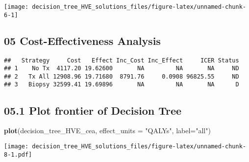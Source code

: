 \documentclass[
]{article}
\newenvironment{Shaded}{\begin{snugshade}}{\end{snugshade}}
\newcommand{\CommentTok}[1]{\textcolor[rgb]{0.56,0.35,0.01}{\textit{#1}}}
\newcommand{\DataTypeTok}[1]{\textcolor[rgb]{0.13,0.29,0.53}{#1}}
\newcommand{\KeywordTok}[1]{\textcolor[rgb]{0.13,0.29,0.53}{\textbf{#1}}}
\newcommand{\NormalTok}[1]{#1}
\newcommand{\OperatorTok}[1]{\textcolor[rgb]{0.81,0.36,0.00}{\textbf{#1}}}
\newcommand{\StringTok}[1]{\textcolor[rgb]{0.31,0.60,0.02}{#1}}
\begin{document}
\texttt{[image: decision\_tree\_HVE\_solutions\_files/figure-latex/unnamed-chunk-6-1]}

\hypertarget{cost-effectiveness-analysis}{%
\subsection{05 Cost-Effectiveness
Analysis}\label{cost-effectiveness-analysis}}

\begin{Shaded}
\end{Shaded}

\begin{verbatim}
##   Strategy     Cost   Effect Inc_Cost Inc_Effect     ICER Status
## 1    No Tx  4117.20 19.62600       NA         NA       NA     ND
## 2   Tx All 12908.96 19.71680  8791.76     0.0908 96825.55     ND
## 3   Biopsy 32599.41 19.69896       NA         NA       NA      D
\end{verbatim}

\hypertarget{plot-frontier-of-decision-tree}{%
\subsection{05.1 Plot frontier of Decision
Tree}\label{plot-frontier-of-decision-tree}}

\begin{Shaded}
\begin{Highlighting}[]
\KeywordTok{plot}\NormalTok{(decision_tree_HVE_cea, }\DataTypeTok{effect_units =} \StringTok{"QALYs"}\NormalTok{, }\DataTypeTok{label=}\StringTok{"all"}\NormalTok{)}
\end{Highlighting}
\end{Shaded}

\texttt{[image: decision\_tree\_HVE\_solutions\_files/figure-latex/unnamed-chunk-8-1.pdf]}
\end{document}
